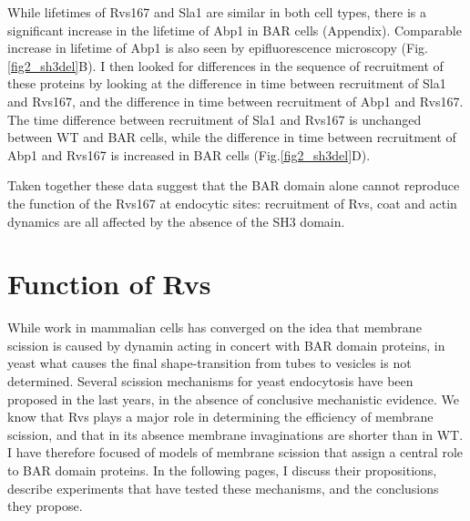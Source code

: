 \vspace{5mm}
\newpage
While lifetimes of Rvs167 and Sla1 are similar in both cell types, there is a significant increase in the lifetime of Abp1 in BAR cells (Appendix). Comparable increase in lifetime of Abp1 is also seen by epifluorescence microscopy (Fig.\ref{fig2_sh3del}B). I then looked for differences in the sequence of recruitment of these proteins by looking at the difference in time between recruitment of Sla1 and Rvs167, and the difference in time between recruitment of Abp1 and Rvs167. The time difference between recruitment of Sla1 and Rvs167 is unchanged between WT and BAR cells, while the difference in time between recruitment of Abp1 and Rvs167 is increased in BAR cells  (Fig.\ref{fig2_sh3del}D).

	\vspace{5mm}
Taken together these data suggest that the BAR domain alone cannot reproduce the function of the Rvs167 at endocytic sites: recruitment of Rvs, coat and actin dynamics are all affected by the absence of the SH3 domain. 

\newpage
		
\section{Function of Rvs}
\label{scisson_models}

While work in mammalian cells has converged on the idea that membrane scission is caused by dynamin acting in concert with BAR domain proteins, in yeast what causes the final shape-transition from tubes to vesicles is not determined. Several scission mechanisms for yeast endocytosis have been proposed in the last years, in the absence of conclusive mechanistic evidence. We know that Rvs plays a major role in determining the efficiency of membrane scission, and that in its absence membrane invaginations are shorter than in WT. I have therefore focused of models of membrane scission that assign a central role to BAR domain proteins. In the following pages, I discuss their propositions, describe experiments that have tested these mechanisms, and the conclusions they propose. 


